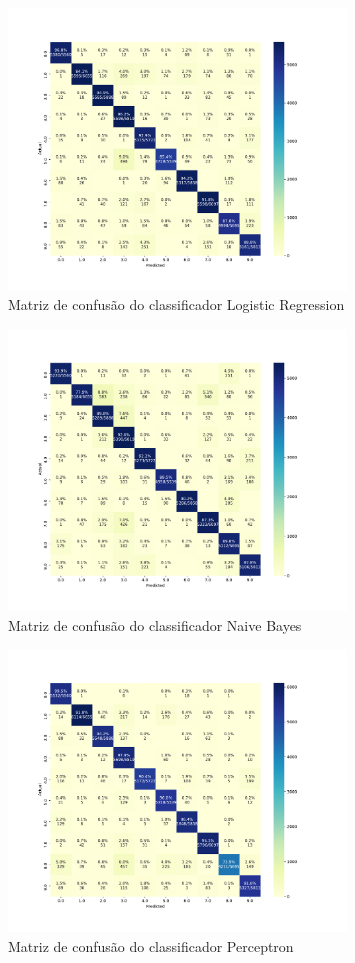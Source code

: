 \documentclass[12pt,
	english,			%
	french,				%
	spanish,			%
	brazil,				%
	]{article}
\begin{document}
\begin{figure}[H]
\centering
\includegraphics[width=0.8\textwidth]{confusion_logistic.pdf}
\caption{\label{fig:confusion_logistic}Matriz de confusão do classificador Logistic Regression}
\end{figure}

\begin{figure}[H]
\centering
\includegraphics[width=0.8\textwidth]{confusion_naive.pdf}
\caption{\label{fig:confusion_naive}Matriz de confusão do classificador Naive Bayes}
\end{figure}

\begin{figure}[H]
\centering
\includegraphics[width=0.8\textwidth]{confusion_perceptron.pdf}
\caption{\label{fig:confusion_perceptron}Matriz de confusão do classificador Perceptron}
\end{figure}
\end{document}
